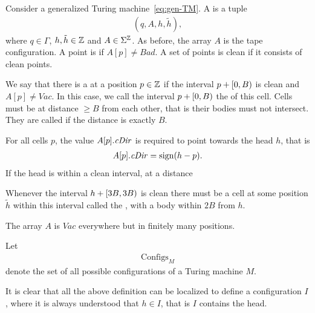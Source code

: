 \documentclass[12pt]{memoir}
\renewcommand{\ge}{\geq}
\newcommand{\fld}[1]{\ensuremath{\textit{#1\/}}}
\newcommand{\sign}{\mathop\mathrm{sign}}
\def\B{B}
\newcommand{\Bad}{\mathit{Bad}}
\newcommand{\Vacant}{\mathit{Vac}}
\newcommand{\Configs}{\mathrm{Configs}}
\newcommand{\h}{h}
\newcommand{\hc}{\tilde h}
\newcommand{\cDir}{\fld{cDir}}
\begin{document}
\begin{definition}[Configuration]\label{def:config}
     Consider a generalized Turing machine~\eqref{eq:gen-TM}.
    A  is a tuple
        \begin{align*}
             (q,A,\h,\hc),
        \end{align*}
    where \( q\in\Gamma \), \( \h,\hc\in\bbZ \) and \( A\in\Sigma^{\mathbb{Z}} \).
As before, the array \( A \) is the tape configuration.
A point is  if  \( A[p]\ne\Bad \).
A set of points is clean if it consists of clean points.

We say that there is a  at a position \( p\in\mathbb{Z} \) if the interval
\( p+\lint{0}{\B} \) is clean and \( A[p]\ne \Vacant \).
In this case, we call the interval \( p+\lint{0}{\B} \) the  of this cell.
Cells must be at distance \( \ge\B \) from each other, that is their
bodies must not intersect.
They are called  if the distance is exactly \( \B \).

For all cells \( p \), the value \( A[p].\cDir \) is required to point towards 
the head \( \h \), that is 
 \begin{align*}
   A[p].\cDir=\sign(\h-p).
 \end{align*}
If the head is within a clean interval, at a distance

Whenever the interval \( \h+\lint{3\B}{3\B} \) is clean there must be a
cell at some position \( \hc \) within this interval called the ,
with a body within \( 2\B \) from \( \h \).

The array \( A \) is \( \Vacant \) everywhere but in finitely many positions.

Let
    \begin{align*}
         \Configs_{M}
    \end{align*}
    denote the set of all possible configurations
    of a Turing machine \( M \).

\end{definition}

It is clear that all the above definition can be localized to define a configuration
 \( I \), where it is always understood that \( \h\in I \), that is 
\( I \) contains the head.
\end{document}
